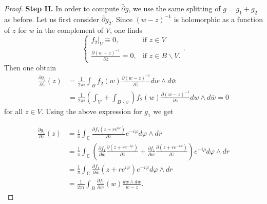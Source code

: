 \begin{proof}
\textbf{Step II.} In order to compute $\bar{\partial} g$, we use the same splitting of $g=g_1+g_2$ as before. Let us first consider $\bar{\partial} g_2$. Since $(w-z)^{-1}$ is holomorphic as a function of $z$ for $w$ in the complement of $V$, one finds
\[
  \begin{cases}
    f_2|_V\equiv 0, & \mbox{if } z\in V \\
    \frac{\partial (w-z)^{-1}}{\partial \overline{z}}=0, & \mbox{if } z\in B\backslash V.
  \end{cases}.
\]
Then one obtain
\begin{align*}
\frac{\partial g_2}{\partial \bar{z}}(z) &=\frac{1}{2 \pi i} \int_B f_2(w) \frac{\partial(w-z)^{-1}}{\partial \bar{z}} d w \wedge d \bar{w}\\
&=\frac{1}{2 \pi i} (\int_V+\int_{B\backslash v}) f_2(w) \frac{\partial(w-z)^{-1}}{\partial \bar{z}} d w \wedge d \bar{w}=0
\end{align*}
for all $z \in V$.
Using the above expression for $g_1$ we get

\begin{align*}
\frac{\partial g_1}{\partial \bar{z}}(z) & =\frac{1}{\pi} \int_{\mathbb{C}} \frac{\partial f_1\left(z+r e^{i \varphi}\right)}{\partial \bar{z}} e^{-i \varphi} d \varphi \wedge d r \\
& =\frac{1}{\pi} \int_{\mathbb{C}}\left(\frac{\partial f_1}{\partial \bar{w}} \frac{\partial\left(\bar{z}+r e^{-i \varphi}\right)}{\partial \bar{z}}+\frac{\partial f_1}{\partial w} \frac{\partial\left(z+r e^{-i \varphi}\right)}{\partial \bar{z}}\right) e^{-i \rho} d \varphi \wedge d r \\
& =\frac{1}{\pi} \int_{\mathbb{C}} \frac{\partial f_1}{\partial \bar{w}}\left(z+r e^{i \varphi}\right) e^{-i \varphi} d \varphi \wedge d r \\
& =\frac{1}{2 \pi i} \int_B \frac{\partial f_1}{\partial \bar{w}}(w) \frac{d w \wedge d \bar{w}}{w-z} .
\end{align*}


\end{proof}
